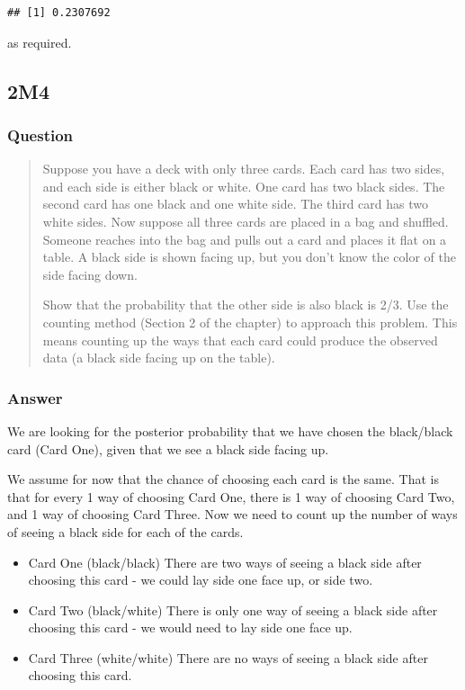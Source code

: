\documentclass[
]{book}
\begin{document}
\begin{verbatim}
## [1] 0.2307692
\end{verbatim}

as required.

\hypertarget{m4}{%
\subsection*{2M4}\label{m4}}

\hypertarget{question-7}{%
\subsubsection*{Question}\label{question-7}}

\begin{quote}
Suppose you have a deck with only three cards. Each card has two sides, and each side is either black or white. One card has two black sides. The second card has one black and one white side. The third card has two white sides. Now suppose all three cards are placed in a bag and shuffled. Someone reaches into the bag and pulls out a card and places it flat on a table. A black side is shown facing up, but you don't know the color of the side facing down.

Show that the probability that the other side is also black is 2/3. Use the counting method (Section 2 of the chapter) to approach this problem. This means counting up the ways that each card could produce the observed data (a black side facing up on the table).
\end{quote}

\hypertarget{answer-7}{%
\subsubsection*{Answer}\label{answer-7}}

We are looking for the posterior probability that we have chosen the black/black card (Card One), given that we see a black side facing up.

We assume for now that the chance of choosing each card is the same. That is that for every 1 way of choosing Card One, there is 1 way of choosing Card Two, and 1 way of choosing Card Three. Now we need to count up the number of ways of seeing a black side for each of the cards.

\begin{itemize}
\item
  Card One (black/black)
  There are two ways of seeing a black side after choosing this card - we could lay side one face up, or side two.
\item
  Card Two (black/white)
  There is only one way of seeing a black side after choosing this card - we would need to lay side one face up.
\item
  Card Three (white/white)
  There are no ways of seeing a black side after choosing this card.
\end{itemize}
\end{document}
